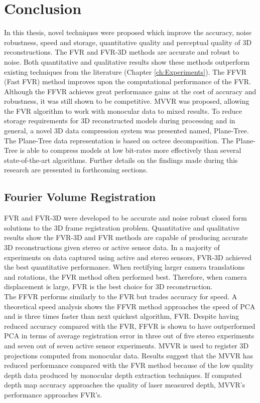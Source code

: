 \makeatletter
\chapter{Conclusion}
\label{ch:Conclusion}

In this thesis, novel techniques were proposed which improve the accuracy, noise robustness, speed and storage, quantitative quality and perceptual quality of 3D reconstructions. The FVR and FVR-3D methods are accurate and robust to noise. Both quantitative and qualitative results show these methods outperform existing techniques from the literature (Chapter \ref{ch:Experiments}). The FFVR (Fast FVR) method improves upon the computational performance of the FVR. Although the FFVR achieves great performance gains at the cost of accuracy and robustness, it was still shown to be competitive. MVVR was proposed, allowing the FVR algorithm to work with monocular data to mixed results. To reduce storage requirements for 3D reconstructed models during processing and in general, a novel 3D data compression system was presented named, Plane-Tree. The Plane-Tree data representation is based on octree decomposition. The Plane-Tree is able to compress models at low bit-rates more effectively than several state-of-the-art algorithms. Further details on the findings made during this research are presented in forthcoming sections. \\

\section{Fourier Volume Registration}
\label{Sec:ConcFVR}

FVR and FVR-3D were developed to be accurate and noise robust closed form solutions to the 3D frame registration problem. Quantitative and qualitative results show the FVR-3D and FVR methods are capable of producing accurate 3D reconstructions given stereo or active sensor data. In a majority of experiments on data captured using active and stereo sensors, FVR-3D achieved the best quantitative performance.  When rectifying larger camera translations and rotations, the FVR method often performed best. Therefore, when camera displacement is large, FVR is the best choice for 3D reconstruction. \\

The FFVR performs similarly to the FVR but trades accuracy for speed. A theoretical speed analysis shows the FFVR method approaches the speed of PCA and is three times faster than next quickest algorithm, FVR. Despite having reduced accuracy compared with the FVR, FFVR is shown to have outperformed PCA in terms of average registration error in three out of five stereo experiments and seven out of seven active sensor experiments. MVVR is used to register 3D projections computed from monocular data. Results suggest that the MVVR has reduced performance compared with the FVR method because of the low quality depth data produced by monocular depth extraction techniques. If computed depth map accuracy approaches the quality of laser measured depth, MVVR's performance approaches FVR's. \\


